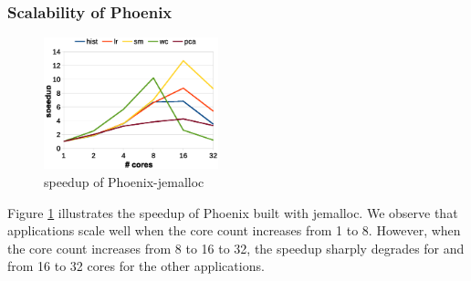 

\subsubsection{Scalability of Phoenix}

\begin{figure}[!h!t]  
	\centering
	\includegraphics[width=0.45\textwidth]{eps/phoenix_speedup_jemalloc.eps}
	\caption{speedup of Phoenix-jemalloc}
	\label{fig:phoenix:speedup:jemalloc}
\end{figure}


Figure \ref{fig:phoenix:speedup:jemalloc} illustrates the speedup of Phoenix built with jemalloc.
We observe that applications scale well when the core count increases from 1 to 8.
However, when the core count increases from 8 to 16 to 32, the speedup sharply degrades for  and from 16 to 32 cores for the other applications.



